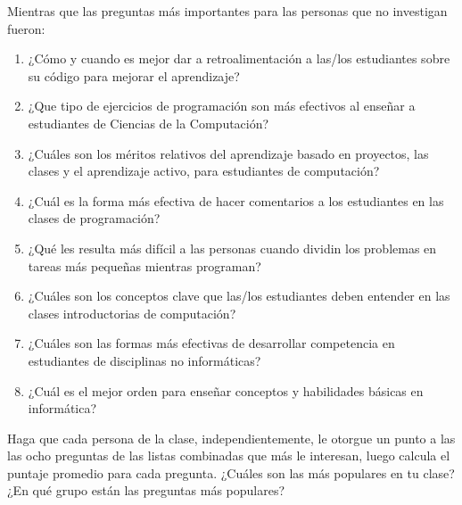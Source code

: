 \noindent
Mientras que las preguntas más importantes para las personas que no investigan fueron:

\begin{enumerate}

\item
  ¿Cómo y cuando es mejor dar a retroalimentación a las/los estudiantes sobre su código para mejorar el aprendizaje?

\item
  ¿Que tipo de ejercicios de programación son más efectivos al enseñar a estudiantes de Ciencias de la Computación?

\item
  ¿Cuáles son los méritos relativos del aprendizaje basado en proyectos, las clases y el aprendizaje activo, para estudiantes de computación?

\item
  ¿Cuál es la forma más efectiva de hacer comentarios a los estudiantes en las clases de programación?

\item
  ¿Qué les resulta más difícil a las personas cuando dividin los problemas en tareas más pequeñas mientras programan?

\item
  ¿Cuáles son los conceptos clave que las/los estudiantes deben entender en las clases introductorias de computación?

\item
  ¿Cuáles son las formas más efectivas de desarrollar competencia en estudiantes de disciplinas no informáticas?

\item
  ¿Cuál es el mejor orden para enseñar conceptos y habilidades básicas en informática?

\end{enumerate}

Haga que cada persona de la clase, independientemente, le otorgue un punto a las 
las ocho preguntas de las listas combinadas que más le interesan,
luego calcula el puntaje promedio para cada pregunta.
¿Cuáles son las más populares en tu clase?
¿En qué grupo  están las preguntas más populares?
